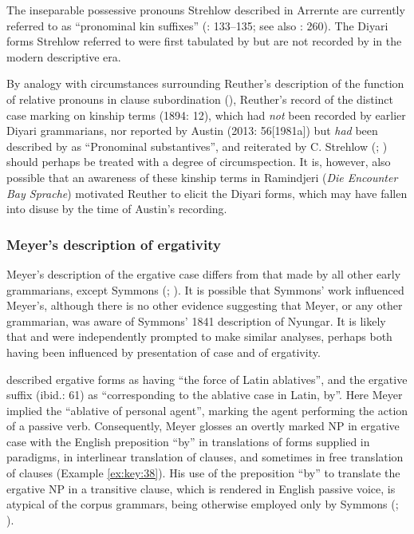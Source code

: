 The inseparable possessive pronouns Strehlow described in Arrernte are currently referred to as “pronominal kin suffixes” (\citealt{Wilkins1989}: 133--135; see also \citealt{Henderson2013}: 260). The Diyari forms Strehlow referred to were first tabulated by \citet[10]{Reuther1894} but are not recorded by \citet[56]{austin_grammar_2013} in the modern descriptive era.

By analogy with circumstances surrounding Reuther’s description of the function of relative pronouns in clause subordination (), Reuther’s record of the distinct case marking on kinship terms (1894: 12), which had \textit{not} been recorded by earlier Diyari grammarians, nor reported by Austin (2013: 56[1981a]) but \textit{had} been described by \citet[34]{meyer_vocabulary_1843} as ``Pronominal substantives'', and reiterated by C. Strehlow (\citealt[50--51]{strehlow_untitled_1931}; ) should perhaps be treated with a degree of circumspection. It is, however, also possible that an awareness of these kinship terms in Ramindjeri (\textit{Die Encounter Bay Sprache}) motivated Reuther to elicit the Diyari forms, which may have fallen into disuse by the time of Austin’s recording.

\subsubsection{Meyer’s description of ergativity}
\label{sec:key:6.1.2.6}
\label{bkm:Ref335757427}
\label{sec:6.1.2.6}
\largerpage
Meyer’s description of the ergative case differs from that made by all other early grammarians, except Symmons (\citeyear{Symmons1841}; ). It is possible that Symmons’ work influenced Meyer’s, although there is no other evidence suggesting that Meyer, or any other grammarian, was aware of Symmons' 1841 description of Nyungar. It is likely that \citet{meyer_vocabulary_1843} and \citet{Symmons1841} were independently prompted to make similar analyses, perhaps both having been influenced by  presentation of case and of ergativity.

\citet[38]{meyer_vocabulary_1843} described ergative forms as having “the force of Latin ablatives”, and the ergative suffix (ibid.: 61) as “corresponding to the ablative case in Latin, by”. Here Meyer implied the ``ablative of personal agent'', marking the agent performing the action of a passive verb. Consequently, Meyer glosses an overtly marked NP in ergative case with the English preposition “by” in translations of forms supplied in paradigms, in interlinear translation of clauses, and sometimes in free translation of clauses (Example \ref{ex:key:38}). His use of the preposition “by” to translate the ergative NP in a transitive clause, which is rendered in English passive voice, is atypical of the corpus grammars, being otherwise employed only by Symmons (\citeyear{Symmons1841}; ).

